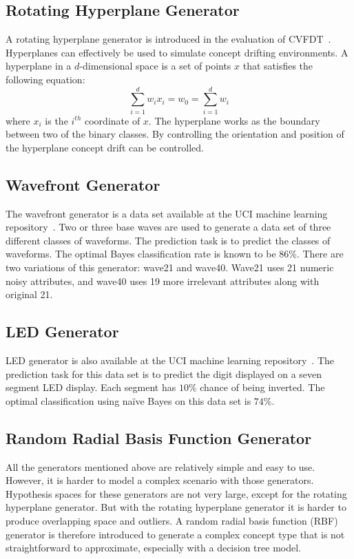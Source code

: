 \subsection*{Rotating Hyperplane Generator}
A rotating hyperplane generator is introduced in the evaluation of CVFDT~\cite{hulten01:cvfdt}. Hyperplanes can effectively be used to simulate concept drifting environments. A hyperplane in a $d$-dimensional space is a set of points $x$ that satisfies the following equation:
\[
    \sum_{i=1}^{d} w_i x_i = w_0 = \sum_{i=1}^{d} w_i
\]
where $x_i$ is the $i^{th}$ coordinate of $x$. The hyperplane works as the boundary between two of the binary classes. By controlling the orientation and position of the hyperplane concept drift can be controlled. 

\subsection*{Wavefront Generator}
The wavefront generator is a data set available at the UCI machine learning repository~\cite{internet:ucirepo}. Two or three base waves are used to generate a data set of three different classes of waveforms. The prediction task is to predict the classes of waveforms. The optimal Bayes classification rate is known to be $86\%$. There are two variations of this generator: wave21 and wave40. Wave21 uses 21 numeric noisy attributes, and wave40 uses 19 more irrelevant attributes along with original 21.

\subsection*{LED Generator}
LED generator is also available at the UCI machine learning repository~\cite{internet:ucirepo}. The prediction task for this data set is to predict the digit displayed on a seven segment LED display. Each segment has $10\%$ chance of being inverted. The optimal classification using na\"ive Bayes on this data set is  $74\%$. 

\subsection*{Random Radial Basis Function Generator}
All the generators mentioned above are relatively simple and easy to use. However, it is harder to model a complex scenario with those generators. Hypothesis spaces for these generators are not very large, except for the rotating hyperplane generator. But with the rotating hyperplane generator it is harder to produce overlapping space and outliers. A random radial basis function (RBF) generator is therefore introduced to generate a complex concept type that is not straightforward to approximate, especially with a decision tree model.

